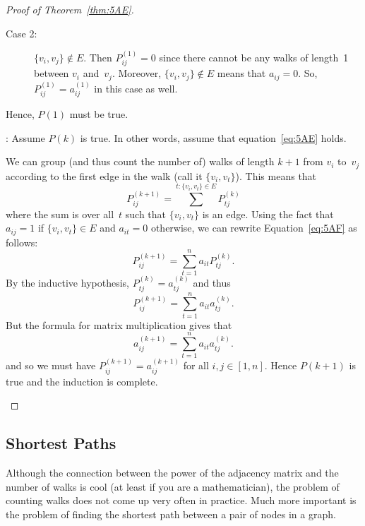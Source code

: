 \begin{proof}[Proof of Theorem~\ref{thm:5AE}]
\begin{editingnotes}
\begin{description}
\item[Case 2:]

$\{ v_i, v_j \} \notin E$.  Then $P_{ij}^{(1)} = 0$ since there
  cannot be any walks of length~1 between $v_i$ and~$v_j$.  Moreover,
  $\{ v_i, v_j \} \notin E$ means that $a_{ij} = 0$.  So,
  $P_{ij}^{(1)} = a_{ij}^{(1)}$ in this case as well.

\end{description}

Hence, $P(1)$ must be true.

:
Assume $P(k)$ is true.  In other words, assume that
equation~\ref{eq:5AE} holds.

We can group (and thus count the number of) walks of length $k+1$
from $v_i$ to~$v_j$ according to the first edge in the walk (call it
$\{ v_i, v_t \}$).  This means that
\begin{equation}\label{eq:5AF}
    P_{ij}^{(k + 1)} = \sum^{t: \{ v_i, v_t \} \in E} P_{tj}^{(k)}
\end{equation}
where the sum is over all~$t$ such that $\{ v_i, v_t \}$ is an edge.
Using the fact that $a_{ij} = 1$ if $\{ v_i, v_t \} \in E$ and $a_{it}
= 0$ otherwise, we can rewrite Equation~\ref{eq:5AF} as follows:
\begin{equation*}
    P_{ij}^{(k + 1)} = \sum_{t = 1}^{n} a_{it} P_{tj}^{(k)}.
\end{equation*}
By the inductive hypothesis, $P_{tj}^{(k)} = a_{tj}^{(k)}$ and thus
\begin{equation*}
    P_{ij}^{(k + 1)} = \sum_{t = 1}^{n} a_{it} a_{tj}^{(k)}.
\end{equation*}
But the formula for matrix multiplication gives that
\begin{equation*}
    a_{ij}^{(k + 1)} = \sum_{t = 1}^{n} a_{it} a_{tj}^{(k)}.
\end{equation*}
and so we must have $P_{ij}^{(k+1)} = a_{ij}^{(k+1)}$ for all $i, j
\in [1, n]$.  Hence $P(k+1)$ is true and the induction is complete.
\end{editingnotes}

\end{proof}

\subsection{Shortest Paths}

Although the connection between the power of the adjacency matrix and
the number of walks is cool (at least if you are a mathematician), the
problem of counting walks does not come up very often in practice.
Much more important is the problem of finding the shortest path
between a pair of nodes in a graph.

